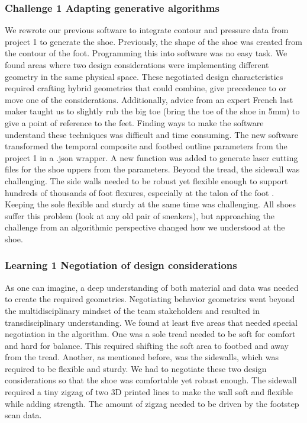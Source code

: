 \subsubsection{Challenge 1 Adapting generative algorithms}

We rewrote our previous software \cite{Feijs2015} to integrate contour and pressure data from project 1 to generate the shoe. Previously, the shape of the shoe was created from the contour of the foot. Programming this into software was no easy task. We found areas where two design considerations were implementing different geometry in the same physical space. These negotiated design characteristics required crafting hybrid geometries that could combine, give precedence to or move one of the considerations. Additionally, advice from an expert French last maker taught us to slightly rub the big toe (bring the toe of the shoe in 5mm) to give a point of reference to the feet. Finding ways to make the software understand these techniques was difficult and time consuming.  
The new software transformed the temporal composite and footbed outline parameters from the project 1 in a .json wrapper. A new function was added to generate laser cutting files for the shoe uppers from the parameters. Beyond the tread,  the sidewall was challenging. The side walls needed to be robust yet flexible enough to support hundreds of thousands of foot flexures, especially at the talon of the foot . Keeping the sole flexible and sturdy at the same time was challenging. All shoes suffer this problem (look at any old pair of sneakers), but approaching the challenge from an algorithmic perspective changed how we  understood at the shoe. 


\subsubsection{Learning 1 Negotiation of design considerations}

As one can imagine, a deep understanding of both material and data was needed to create the required geometries. Negotiating behavior geometries went beyond the multidisciplinary mindset of the team stakeholders and resulted in transdisciplinary understanding. We found at least five areas that needed special negotiation in the algorithm. One was a sole tread needed to be soft for comfort and hard for balance. This required shifting the soft area to footbed and away from the tread. Another, as mentioned before, was the sidewalls, which was required to be flexible and sturdy. We had to negotiate these two design considerations so that the shoe was comfortable yet robust enough. The sidewall required a tiny zigzag of two 3D printed lines to make the wall soft and flexible while adding strength. The amount of zigzag needed to be driven by the footstep scan data. 

